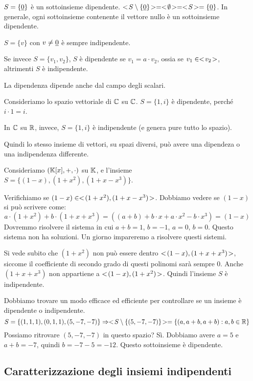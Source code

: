 $S = \{ \underline{0} \}$ \`e un sottoinsieme dipendente. $<\!{S \setminus \{ \underline{0} \}}\!> = <\!{\emptyset}\!> = <\!{S}\!> = \{ \underline{0} \}$. In generale, ogni sottoinsieme contenente il vettore nullo \`e un sottoinsieme dipendente.

$S = \{ v \}$ con $v \neq \underline{0}$ \`e sempre indipendente.

Se invece $S = \{ v_1, v_2 \}$, $S$ \`e dipendente se $v_1  = a \cdot v_2$, ossia se $v_1 \in <\!{v_2}\!>$, altrimenti $S$ \`e indipendente.

La dipendenza dipende anche dal campo degli scalari.

Consideriamo lo spazio vettoriale di $\mathbb{C}$ su $\mathbb{C}$. $S = \{ 1, i \}$ \`e dipendente, perch\'e $i \cdot 1 = i$.

In $\mathbb{C}$ su $\mathbb{R}$, invece, $S = \{1,i\}$ \`e indipendente (e genera pure tutto lo spazio).

Quindi lo stesso insieme di vettori, su spazi diversi, pu\`o avere una dipendeza o una indipendenza differente.

Consideriamo $(\mathbb{K}[x], +, \cdot)$ su $\mathbb{K}$, e l'insieme $S = \{ (1 - x), (1 + x^2), (1 + x - x^3) \}$.

Verifichiamo se $(1 - x) \in <\!{(1 + x^2), (1 + x - x^3)}\!>$. Dobbiamo vedere se $(1 - x)$ si pu\`o scrivere come:
\[
a \cdot (1 + x^2) + b \cdot (1 + x + x^3) = ((a+b) + b \cdot x + a \cdot x^2 - b \cdot x^3) = (1 - x)
\]
Dovremmo risolvere il sistema in cui $a + b = 1$, $b = -1$, $a = 0$, $b = 0$. Questo sistema non ha soluzioni. Un giorno impareremo a risolvere questi sistemi.

Si vede subito che $(1 + x^2)$ non pu\`o essere dentro $<\!{(1 - x), (1 + x + x^3)}\!>$, siccome il coefficiente di secondo grado di questi polinomi sar\`a sempre 0. Anche $(1 + x + x^3)$ non appartiene a $<\!{(1 - x), (1 + x^2)}\!>$. Quindi l'insieme $S$ \`e indipendente.

Dobbiamo trovare un modo efficace ed efficiente per controllare se un insieme \`e dipendente o indipendente.
\[
S = \{ (1,1,1), (0,1,1), (5, -7, -7)\}
\Rightarrow
<\!{S \setminus \{(5, -7, -7)\}}\!> = \{ (a, a+b, a+b) : a, b \in \mathbb{R} \}
\]
Possiamo ritrovare $(5, -7, -7)$ in questo spazio? S\`i. Dobbiamo avere $a = 5$ e $a + b = -7$, quindi $b = -7 - 5 = -12$. Questo sottoinsieme \`e dipendente.

\subsection{Caratterizzazione degli insiemi indipendenti}

